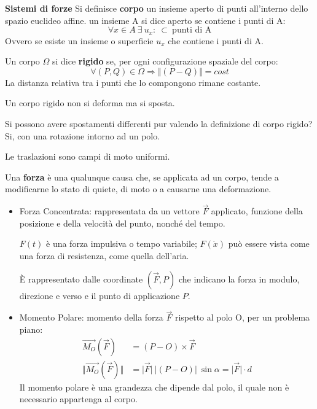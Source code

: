 \documentclass{article}
\begin{document}
\begin{adjustwidth}{2in}{}
{\Large \textbf{Sistemi di forze}} \mbox{} \newline
Si definisce \textbf{corpo} un insieme aperto di punti all'interno dello spazio euclideo affine.\newline
un insieme A si dice aperto se contiene i punti di A: 
\[\forall x \in A ~ \exists ~ u_{x} : ~ \subset ~ \text{punti di A}\]
Ovvero se esiste un insieme o superficie $u_x$ che contiene i punti di A. \newline

Un corpo $\Omega$ si dice \textbf{rigido} se, per ogni configurazione spaziale del corpo:
\[\forall (P,Q) \in \Omega \Rightarrow \Vert(P-Q)\Vert=cost\]
La distanza relativa tra  i punti che lo compongono rimane costante. 

Un corpo rigido non si deforma ma si sposta. 

Si possono avere spostamenti differenti pur valendo la definizione di corpo rigido? Si, con una rotazione intorno ad un polo.

Le traslazioni sono campi di moto uniformi. \newline

Una \textbf{forza} è una qualunque causa che, se applicata ad un corpo, tende a modificarne lo stato di quiete, di moto o a causarne una deformazione. \newline
\begin{itemize}
	\item Forza Concentrata: rappresentata da un vettore $\vec{F}$ applicato, funzione della posizione e della velocità del punto, nonché del tempo.
	
	$F(t)$ è una forza impulsiva o tempo variabile;
	$F(\dot{x})$ può essere vista come una forza di resistenza, come quella dell'aria. 
	
	
	È rappresentato dalle coordinate $(\vec{F}, P)$ che indicano la forza in modulo, direzione e verso e il punto di applicazione $P$. \newline 
	\newpage
	\item Momento Polare: momento della forza  $\vec{F}$ rispetto al polo O, per un problema piano:
	\[
	\begin{split}
	\vec{M_{O}}(\vec{F}) & = (P-O)\times \vec{F} \\
	\Vert\vec{M_{O}}(\vec{F})\Vert & = \vert\vec{F}\vert ~ \vert(P-O)\vert ~ \sin\alpha = \vert\vec{F}\vert \cdot d
	\end{split}
	\]
	Il momento polare è una grandezza che dipende dal polo, il quale non è necessario appartenga al corpo.
	

\end{itemize}
\end{adjustwidth}
\end{document}
